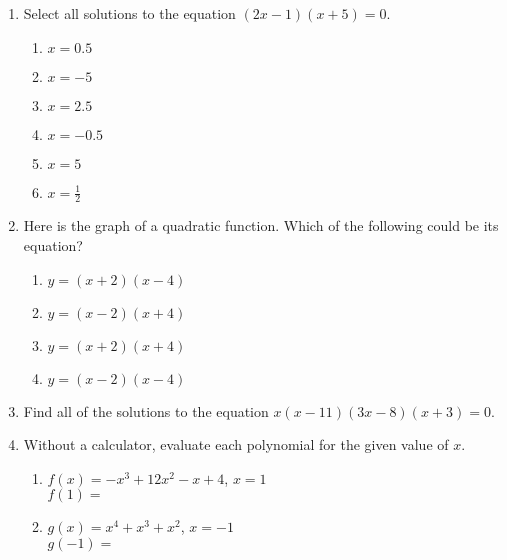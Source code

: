 \documentclass[12pt, twoside]{article}
\begin{document}
\begin{enumerate}
\item Select all solutions to the equation $(2x-1)(x+5)=0$.
    \begin{multicols}{2}
    \begin{enumerate}
        \item $x=0.5$
        \item $x=-5$
        \item $x=2.5$
        \item $x=-0.5$
        \item $x=5$
        \item $x=\frac{1}{2}$
    \end{enumerate}
    \end{multicols}
    \vspace{0.25cm}

\item Here is the graph of a quadratic function. Which of the following could be its equation?
    \begin{center}
    \end{center}
    \begin{multicols}{2}
    \begin{enumerate}
        \item $y=(x+2)(x-4)$
        \item $y=(x-2)(x+4)$
        \item $y=(x+2)(x+4)$
        \item $y=(x-2)(x-4)$
    \end{enumerate}
    \end{multicols}

\item Find all of the solutions to the equation $x(x-11)(3x-8)(x+3)=0$. 

\newpage
\item Without a calculator, evaluate each polynomial for the given value of $x$.
\begin{multicols}{2}
    \begin{enumerate}[itemsep=1cm]
        \item $f(x)=-x^3+12x^2-x+4$, $x=1$ \\[0.25cm] 
        $f(1) = $ \vspace{2cm}
        \item $g(x)=x^4+x^3+x^2$, $x=-1$ \\[0.25cm] 
        $g(-1) = $ \vspace{2cm}
    \end{enumerate}
    \end{multicols}


\end{enumerate}
\end{document}
